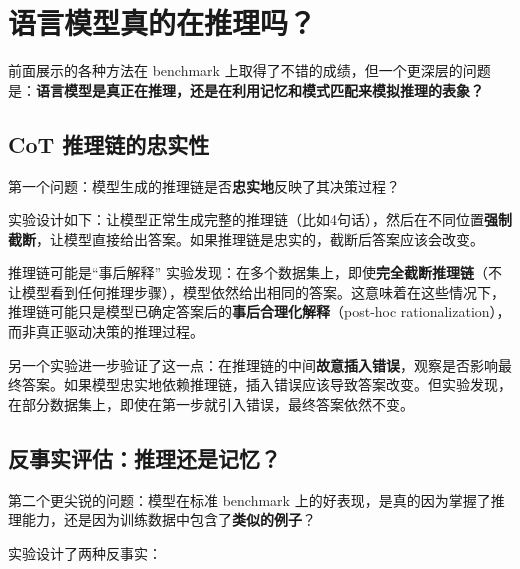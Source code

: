 \documentclass[a4paper]{article}
\begin{document}
\section{语言模型真的在推理吗？}

前面展示的各种方法在 benchmark 上取得了不错的成绩，但一个更深层的问题是：\textbf{语言模型是真正在推理，还是在利用记忆和模式匹配来模拟推理的表象？}




\subsection{CoT 推理链的忠实性}

第一个问题：模型生成的推理链是否\textbf{忠实地}反映了其决策过程？

实验设计如下：让模型正常生成完整的推理链（比如4句话），然后在不同位置\textbf{强制截断}，让模型直接给出答案。如果推理链是忠实的，截断后答案应该会改变。





\begin{warningbox}{推理链可能是``事后解释''}
实验发现：在多个数据集上，即使\textbf{完全截断推理链}（不让模型看到任何推理步骤），模型依然给出相同的答案。这意味着在这些情况下，推理链可能只是模型已确定答案后的\textbf{事后合理化解释}（post-hoc rationalization），而非真正驱动决策的推理过程。
\end{warningbox}

另一个实验进一步验证了这一点：在推理链的中间\textbf{故意插入错误}，观察是否影响最终答案。如果模型忠实地依赖推理链，插入错误应该导致答案改变。但实验发现，在部分数据集上，即使在第一步就引入错误，最终答案依然不变。

\subsection{反事实评估：推理还是记忆？}

第二个更尖锐的问题：模型在标准 benchmark 上的好表现，是真的因为掌握了推理能力，还是因为训练数据中包含了\textbf{类似的例子}？




实验设计了两种反事实：
\end{document}

